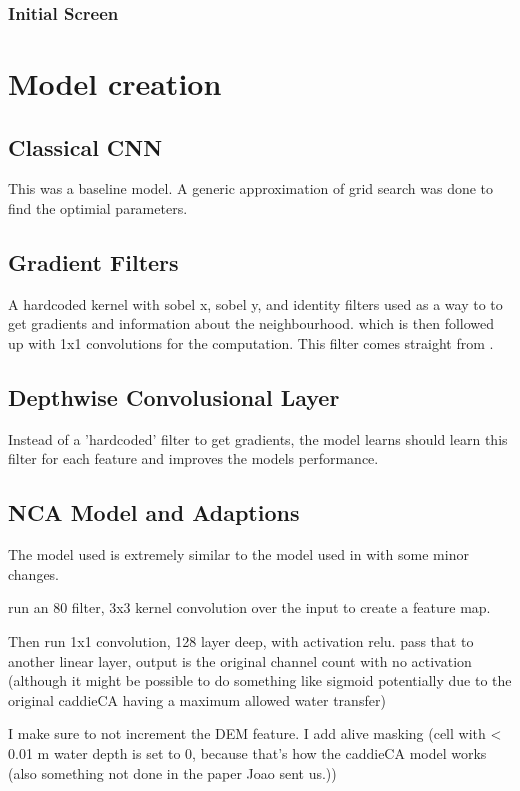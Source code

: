 \subsubsection*{Initial Screen}



\section{Model creation}
\subsection{Classical CNN}
This was a baseline model. A generic approximation of grid search was done to find the optimial parameters.
\subsection{Gradient Filters}
A hardcoded kernel with sobel x, sobel y, and identity filters used as a way to to get gradients and information about the neighbourhood. which is then followed up with 1x1 convolutions for the computation. This filter comes straight from \cite{growing_nca}.

\subsection{Depthwise Convolusional Layer}
Instead of a 'hardcoded' filter to get gradients, the model learns should learn this filter for each feature and improves the models performance.


\subsection{NCA Model and Adaptions}
The model used is extremely similar to the model used in \cite{growing_nca} with some minor changes.

run an 80 filter, 3x3 kernel convolution over the input to create a feature map.

Then run 1x1 convolution, 128 layer deep, with activation relu.
pass that to another linear layer, output is the original channel count with no activation (although it might be possible to do something like sigmoid potentially due to the original caddieCA having a maximum allowed water transfer)

I make sure to not increment the DEM feature. I add alive masking (cell with \textless{} {0.01} m water depth is set to 0, because that's how the caddieCA model works (also something not done in the paper Joao sent us.))

